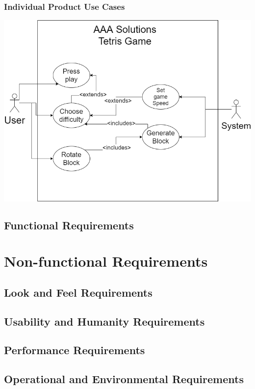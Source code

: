 \documentclass[12pt, titlepage]{article}
\begin{document}
    
    
\subsubsection{Individual Product Use Cases}

\includegraphics[width=0.95\linewidth]{usecasexa3.png}

\subsection{Functional Requirements}

\section{Non-functional Requirements}

\subsection{Look and Feel Requirements}

\subsection{Usability and Humanity Requirements}

\subsection{Performance Requirements}

\subsection{Operational and Environmental Requirements}
\end{document}

